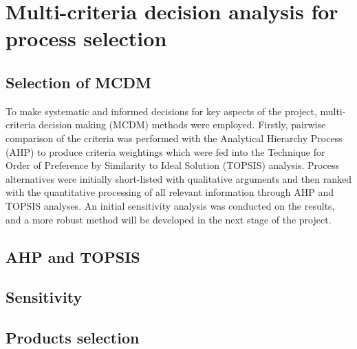 \section{Multi-criteria decision analysis for process selection}

\subsection{Selection of MCDM} %



To make systematic and informed decisions for key aspects of the project, multi-criteria decision making (MCDM) methods were employed. Firstly, pairwise comparison of the criteria was performed with the Analytical Hierarchy Process (AHP) to produce criteria weightings which were fed into the Technique for Order of Preference by Similarity to Ideal Solution (TOPSIS) analysis. Process alternatives were initially short-listed with qualitative arguments and then ranked with the quantitative processing of all relevant information through AHP and TOPSIS analyses. An initial sensitivity analysis was conducted on the results, and a more robust method will be developed in the next stage of the project.



\subsection{AHP and TOPSIS} %


\subsection{Sensitivity} %

\subsection{Products selection}

